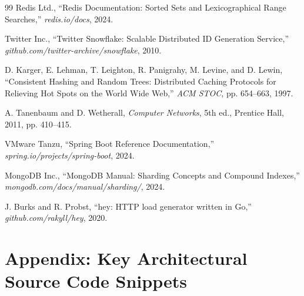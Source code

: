 \documentclass[11pt,a4paper]{article}
\begin{document}
\begin{thebibliography}{99}
Redis Ltd., ``Redis Documentation: Sorted Sets and Lexicographical Range Searches,'' \textit{redis.io/docs}, 2024.

Twitter Inc., ``Twitter Snowflake: Scalable Distributed ID Generation Service,'' \textit{github.com/twitter-archive/snowflake}, 2010.

D. Karger, E. Lehman, T. Leighton, R. Panigrahy, M. Levine, and D. Lewin, ``Consistent Hashing and Random Trees: Distributed Caching Protocols for Relieving Hot Spots on the World Wide Web,'' \textit{ACM STOC}, pp. 654--663, 1997.

A. Tanenbaum and D. Wetherall, \textit{Computer Networks}, 5th ed., Prentice Hall, 2011, pp. 410--415.

VMware Tanzu, ``Spring Boot Reference Documentation,'' \textit{spring.io/projects/spring-boot}, 2024.

MongoDB Inc., ``MongoDB Manual: Sharding Concepts and Compound Indexes,'' \textit{mongodb.com/docs/manual/sharding/}, 2024.

J. Burks and R. Probst, ``hey: HTTP load generator written in Go,'' \textit{github.com/rakyll/hey}, 2020.
\end{thebibliography}

\newpage
\appendix
\section{Appendix: Key Architectural Source Code Snippets}
\end{document}

